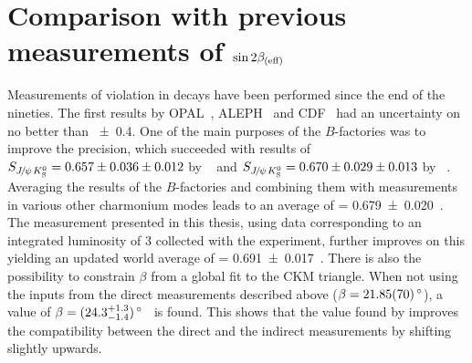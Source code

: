 
\section{Comparison with previous measurements of \texorpdfstring{$\sintwobetaoreff$}{sin2beta(eff)}}
\label{sec:discussion:sin2betahistory}

Measurements of \CP violation in \BdToJPsiKS decays have been performed since
the end of the nineties. The first results by OPAL~\cite{OPAL_sin2beta},
ALEPH~\cite{ALEPH_sin2beta} and CDF~\cite{CDF_sin2beta} had an uncertainty on
\sintwobeta no better than \num{\pm0.4}. One of the main purposes of the
$B$-factories was to improve the precision, which succeeded with results of
$\SJpsiKS = \num[parse-numbers=false]{0.657\pm0.036\pm0.012}$ by
\babar~\cite{BaBar_sin2beta} and $\SJpsiKS =
\num[parse-numbers=false]{0.670\pm0.029\pm0.013}$ by
\belle~\cite{Belle_sin2beta}. Averaging the results of the $B$-factories and
combining them with measurements in various other charmonium modes leads to an
average of \sintwobeta = \num{0.679\pm0.020}~\cite{HFAG}. The measurement
presented in this thesis, using data corresponding to an integrated luminosity
of \SI{3}{\invfb} collected with the \lhcb experiment, further improves on
this yielding an updated world average of \sintwobeta =
\num{0.691\pm0.017}~\cite{HFAG}. There is also the possibility to constrain
$\beta$ from a global fit to the CKM triangle. When not using the inputs from
the direct measurements described above ($\beta =
\SI{21.85\pm0.7}{\degrees}$), a value of $\beta = (24.3
^{+1.3}_{-1.4})\,\degrees$~\cite{CKMfitter} is found. This shows that the
value found by \lhcb improves the compatibility between the direct and the
indirect measurements by shifting \sintwobeta slightly upwards.

